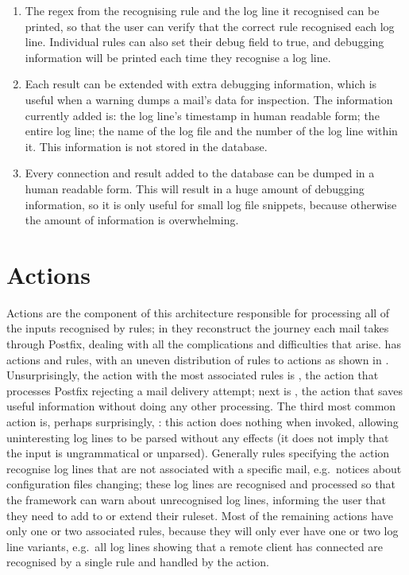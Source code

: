 \begin{enumerate}

    \item The regex from the recognising rule and the log line it
        recognised can be printed, so that the user can verify that the
        correct rule recognised each log line.  Individual rules can also
        set their debug field to true, and debugging information will be
        printed each time they recognise a log line.

    \item Each result can be extended with extra debugging information,
        which is useful when a warning dumps a mail's data for inspection.
        The information currently added is: the log line's timestamp in
        human readable form; the entire log line; the name of the log file
        and the number of the log line within it.  This information is not
        stored in the database.

    \item Every connection and result added to the database can be dumped
        in a human readable form.  This will result in a huge amount of
        debugging information, so it is only useful for small log file
        snippets, because otherwise the amount of information is
        overwhelming.

\end{enumerate}

\section{Actions}

\label{actions in implementation}

Actions are the component of this architecture responsible for processing
all of the inputs recognised by rules; in \parsername{} they reconstruct
the journey each mail takes through Postfix, dealing with all the
complications and difficulties that arise.  \parsername{} has
\numberOFactions{} actions and \numberOFrules{} rules, with an uneven
distribution of rules to actions as shown in .  Unsurprisingly, the action with the most associated
rules is , the action that processes Postfix
rejecting a mail delivery attempt; next is , the action
that saves useful information without doing any other processing.  The
third most common action is, perhaps surprisingly, :
this action does nothing when invoked, allowing uninteresting log lines to
be parsed without any effects (it does not imply that the input is
ungrammatical or unparsed).  Generally rules specifying the
 action recognise log lines that are not associated
with a specific mail, e.g.\ notices about configuration files changing;
these log lines are recognised and processed so that the framework can warn
about unrecognised log lines, informing the user that they need to add to
or extend their ruleset.  Most of the remaining actions have only one or
two associated rules, because they will only ever have one or two log line
variants, e.g.\ all log lines showing that a remote client has connected
are recognised by a single rule and handled by the  action.

